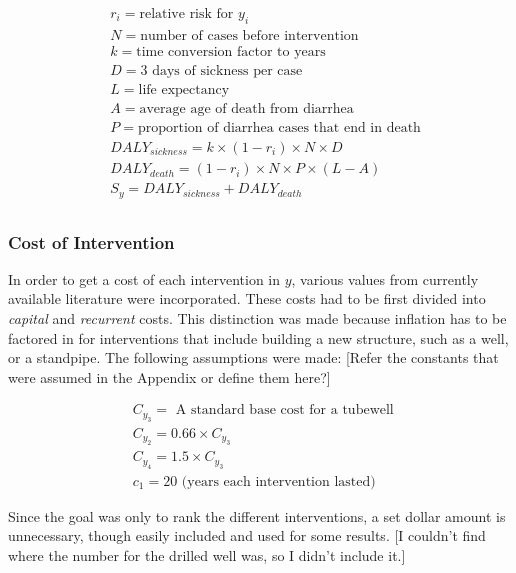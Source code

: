 \begin{equation*}
\begin{aligned}
& r_i = \text{relative risk for } y_i \\
& N = \text{number of cases before intervention} \\
& k = \text{time conversion factor to years} \\
& D = \text{3 days of sickness per case} \\
& L = \text{life expectancy} \\
& A = \text{average age of death from diarrhea} \\
& P = \text{proportion of diarrhea cases that end in death} \\
& DALY_{sickness} = k \times (1-r_i) \times N \times D \\
& DALY_{death} = (1-r_i)\times N \times P \times (L - A) \\
& S_{y} = DALY_{sickness} + DALY_{death} \\
\end{aligned}
\end{equation*}

\subsubsection*{Cost of Intervention}
In order to get a cost of each intervention in $y$, various values from currently available literature were incorporated.
These costs had to be first divided into \emph{capital} and \emph{recurrent} costs.
This distinction was made because inflation has to be factored in for interventions that include building a new structure, such as a well, or a standpipe.
The following assumptions were made:
[Refer the constants that were assumed in the Appendix or define them here?]

\begin{equation*}
\begin{aligned}
& C_{y_{3}} = \text{ A standard base cost for a tubewell } \\
& C_{y_{2}} = 0.66 \times C_{y_{3}} \\
& C_{y_{4}} = 1.5 \times C_{y_{3}} \\ 
& c_1 = 20 \text{ (years each intervention lasted)}
\end{aligned}
\end{equation*}

Since the goal was only to rank the different interventions, a set dollar amount is unnecessary, though easily included and used for some results. [I couldn't find where the number for the drilled well was, so I didn't include it.]
